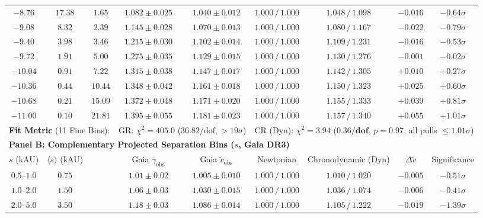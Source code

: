 \documentclass[aps,prd,reprint,superscriptaddress,nofootinbib,floatfix,amsmath,amssymb]{revtex4-2}
\begin{document}
\begin{table}[t]
\begin{ruledtabular}
\begin{tabular}{ccccccccc}
$-8.76$ & $17.38$  & $1.65$ & $1.082 \pm 0.025$ & $1.040 \pm 0.012$ & $1.000 \,/\, 1.000$ & $1.048 \,/\, 1.098$ & $-0.016$ & $-0.64\sigma$ \\
$-9.08$ & $8.32$   & $2.39$ & $1.145 \pm 0.028$ & $1.070 \pm 0.013$ & $1.000 \,/\, 1.000$ & $1.080 \,/\, 1.167$ & $-0.022$ & $-0.79\sigma$ \\
$-9.40$ & $3.98$   & $3.46$ & $1.215 \pm 0.030$ & $1.102 \pm 0.014$ & $1.000 \,/\, 1.000$ & $1.109 \,/\, 1.231$ & $-0.016$ & $-0.53\sigma$ \\
$-9.72$ & $1.91$   & $5.00$ & $1.275 \pm 0.035$ & $1.129 \pm 0.015$ & $1.000 \,/\, 1.000$ & $1.130 \,/\, 1.276$ & $-0.001$ & $-0.02\sigma$ \\
$-10.04$ & $0.91$  & $7.22$ & $1.315 \pm 0.038$ & $1.147 \pm 0.017$ & $1.000 \,/\, 1.000$ & $1.142 \,/\, 1.305$ & $+0.010$ & $+0.27\sigma$ \\
$-10.36$ & $0.44$  & $10.44$ & $1.348 \pm 0.042$ & $1.161 \pm 0.018$ & $1.000 \,/\, 1.000$ & $1.150 \,/\, 1.323$ & $+0.025$ & $+0.60\sigma$ \\
$-10.68$ & $0.21$  & $15.09$ & $1.372 \pm 0.048$ & $1.171 \pm 0.020$ & $1.000 \,/\, 1.000$ & $1.155 \,/\, 1.333$ & $+0.039$ & $+0.81\sigma$ \\
$-11.00$ & $0.10$  & $21.81$ & $1.395 \pm 0.055$ & $1.181 \pm 0.023$ & $1.000 \,/\, 1.000$ & $1.157 \,/\, 1.340$ & $+0.055$ & $+1.01\sigma$ \\
\hline
\multicolumn{3}{l}{\textbf{Fit Metric} (11 Fine Bins):} & \multicolumn{2}{l}{GR: $\chi^2 = 405.0$ ($36.82/\text{dof}, >19\sigma$)} & \multicolumn{4}{l}{CR (Dyn): $\chi^2 = \mathbf{3.94}$ ($\mathbf{0.36/\text{dof}}$, $p = 0.97$, all pulls $\le 1.01\sigma$)} \\
\hline
\multicolumn{9}{l}{\textbf{Panel B: Complementary Projected Separation Bins ($s$, Gaia DR3)}} \\
\hline
$s$ (kAU) & $\langle s \rangle$ (kAU) & & Gaia $\gamma_{\text{obs}}$ & Gaia $\tilde{v}_{\text{obs}}$ & Newtonian & Chronodynamic (Dyn) & $\Delta\tilde{v}$ & Significance \\
\hline
$0.5\text{--}1.0$ & $0.75$ & & $1.01 \pm 0.02$ & $1.005 \pm 0.010$ & $1.000 \,/\, 1.000$ & $1.010 \,/\, 1.020$ & $-0.005$ & $-0.51\sigma$ \\
$1.0\text{--}2.0$ & $1.50$ & & $1.06 \pm 0.03$ & $1.030 \pm 0.015$ & $1.000 \,/\, 1.000$ & $1.036 \,/\, 1.074$ & $-0.006$ & $-0.41\sigma$ \\
$2.0\text{--}5.0$ & $3.50$ & & $1.18 \pm 0.03$ & $1.086 \pm 0.014$ & $1.000 \,/\, 1.000$ & $1.105 \,/\, 1.222$ & $-0.019$ & $-1.39\sigma$ \\

\end{tabular}
\end{ruledtabular}
\end{table}
\end{document}
